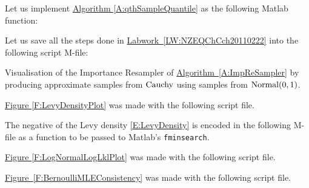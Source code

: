 \begin{labwork}\label{Mf:qthSampleQuantile}
Let us implement \hyperref[A:qthSampleQuantile]{Algorithm \ref*{A:qthSampleQuantile}} as the following {\sc Matlab} function:
{}
\end{labwork}

\begin{labwork}[Loading ]\label{Mf:NZEQChCch20110222}
Let us save all the steps done in \hyperref[LW:NZEQChCch20110222]{Labwork~\ref*{LW:NZEQChCch20110222}} into the following script M-file:
{}
\end{labwork}

\begin{labwork}\label{Mf:ImpResamplerCauchyViaNormal}
Visualisation of the Importance Resampler of \hyperref[A:ImpReSampler]{Algorithm~\ref*{A:ImpReSampler}} by producing approximate samples from $\mbox{{\rm Cauchy}}$ using samples from $\mbox{{\rm Normal}}(0,1)$.
{}
\end{labwork}

\begin{labwork}\label{Mf:LevyDensityPlot}
\hyperref[F:LevyDensityPlot]{Figure \ref*{F:LevyDensityPlot}} was made with the following script file.
{}
\end{labwork}

\begin{labwork}\label{Mf:NegLevyDensity}
The negative of the Levy density \eqref{E:LevyDensity} is encoded in the following M-file as a function to be passed to {\sc Matlab}'s {\tt fminsearch}.
{}
\end{labwork}

\begin{labwork}\label{Mf:LogNormalLogLklPlot}
\hyperref[F:LogNormalLogLklPlot]{Figure \ref*{F:LogNormalLogLklPlot}} was made with the following script file.
{}
\end{labwork}

\begin{labwork}\label{Mf:BernoulliMLEConsistency}
\hyperref[F:BernoulliMLEConsistency]{Figure~\ref*{F:BernoulliMLEConsistency}} was made with the following script file.
{}
\end{labwork}

